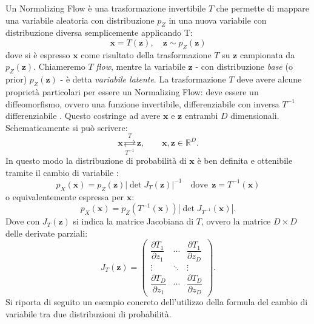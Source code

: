 Un Normalizing Flow è una trasformazione invertibile $T$ che permette di mappare una variabile aleatoria con distribuzione $p_Z$ in una nuova variabile con distribuzione diversa semplicemente applicando T:
\begin{equation}
    \mathbf{x} = T (\mathbf{z}), \quad \mathbf{z} \sim p_Z(\mathbf{z})
\end{equation}
dove si è espresso $\mathbf{x}$ come risultato della trasformazione $T$ su $\mathbf{z}$ campionata da $p_Z(\mathbf{z})$. 
Chiameremo $T$ \emph{flow}, mentre la variabile $\mathbf{z}$ - con distribuzione \emph{base} (o prior) $p_Z(\mathbf{z})$ - è detta \emph{variabile latente}.
La trasformazione $T$ deve avere alcune proprietà particolari per essere un Normalizing Flow: deve essere un diffeomorfismo, ovvero una funzione invertibile, differenziabile con inversa $T^{-1}$ differenziabile \cite{papamakarios2021normalizing}. Questo costringe ad avere $\mathbf{x}$ e $\mathbf{z}$ entrambi $D$ dimensionali. Schematicamente si può scrivere:
\begin{equation}
   \mathbf{x} \underset{T^{-1}}{\overset{T}{\rightleftarrows}} \mathbf{z}, \qquad \mathbf{x}, \mathbf{z} \in \mathbb{R}^D.
\end{equation}
In questo modo la distribuzione di probabilità di $\mathbf{x}$ è ben definita e ottenibile tramite il cambio di variabile \cite{rudin2006real}:
\begin{equation}
p_X(\mathbf{x}) = p_Z(\mathbf{z}) | \det J_T(\mathbf{z})|^{-1} \quad \text{dove} \ \ \mathbf{z}=T^{-1}(\mathbf{x})
\end{equation}
o equivalentemente espressa per $\mathbf{x}$:
\begin{equation}
p_X(\mathbf{x})= p_Z(T^{-1}(\mathbf{x})) |\det J_{T^{-1}}(\mathbf{x})|.
\end{equation}
Dove con $J_T(\mathbf{z})$ si indica la matrice Jacobiana di $T$, ovvero la matrice $D \times D$  delle derivate parziali:
\begin{equation}
    J_T(\mathbf{z}) =
    \begin{pmatrix}
    \dfrac{\partial T_1}{\partial z_1} & \cdots & \dfrac{\partial T_1}{\partial z_D} \\[1em]
    \vdots & \ddots & \vdots \\[0.5em]
    \dfrac{\partial T_D}{\partial z_1} & \cdots & \dfrac{\partial T_D}{\partial z_D}
    \end{pmatrix}.
\end{equation}
Si riporta di seguito un esempio concreto dell'utilizzo della formula del cambio di variabile tra due distribuzioni di probabilità. 


